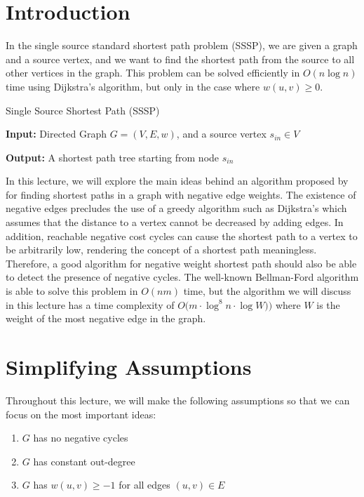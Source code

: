\documentclass[11pt]{article}
\renewcommand{\sin}{s_{in}}
\newenvironment{tight_itemize}{
\begin{itemize}
 \setlength{\itemsep}{2pt}
 \setlength{\parskip}{1pt}
}{\end{itemize}}
\begin{document}
\newcommand{\coursenum}{{CSC 2421H}}
\newcommand{\coursename}{{Graphs, Matrices, and Optimization}}
\newcommand{\courseprof}{Sushant Sachdeva}


\section{Introduction}
In the single source standard shortest path problem (SSSP), we are given a graph and a source vertex, and we want to find the shortest path from the source to all other vertices in the graph. This problem can be solved efficiently in $O(n \log n)$ time using Dijkstra's algorithm, but only in the case where $w(u,v) \geq 0$.

\begin{definition}{Single Source Shortest Path (SSSP)}
    \begin{tight_itemize}
        \item \textbf{Input:} Directed Graph $G = (V,E,w)$, and a source vertex $\sin \in V$
        \item \textbf{Output:} A shortest path tree starting from node $\sin$
    \end{tight_itemize}
    \end{definition}

In this lecture, we will explore the main ideas behind an algorithm proposed by \cite{bernstein2022negative} for finding shortest paths in a graph with negative edge weights. The existence of negative edges precludes the use of a greedy algorithm such as Dijkstra's which assumes that the distance to a vertex cannot be decreased by adding edges. 
In addition, reachable negative cost cycles can cause the shortest path to a vertex to be arbitrarily low, rendering the concept of a shortest path meaningless.
Therefore, a good algorithm for negative weight shortest path should also be able to detect the presence of negative cycles. The well-known Bellman-Ford algorithm is able to solve this problem in $O(nm)$ time, but the algorithm we will discuss in this lecture has a time complexity of $O\big( m  \cdot \log^8 n \cdot \log W ) \big)$ where $W$ is the weight of the most negative edge in the graph.

\section{Simplifying Assumptions}
Throughout this lecture, we will make the following assumptions so that we can focus on the most important ideas:
\begin{enumerate}
    \item $G$ has no negative cycles
    \item $G$ has constant out-degree
    \item $G$ has $w(u,v) \geq -1$ for all edges $(u,v) \in E$
    
\end{enumerate}
\end{document}
